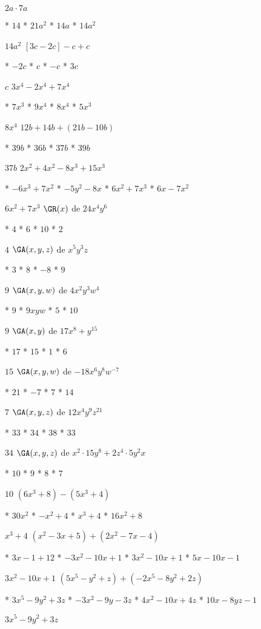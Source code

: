$2a\cdot 7a$
\begin{enum}
	* $14$
	* $21a^2$
	* $14a$
	* $14a^2$
\end{enum}
$14a^2$
$[3c-2c]-c+c$
\begin{enum}
	* $-2c$
	* $c$
	* $-c$
	* $3c$
\end{enum}
$c$
$3x^4-2x^4+7x^4$
\begin{enum}
	* $7x^3$
	* $9x^4$
	* $8x^4$
	* $5x^3$
\end{enum}
$8x^4$
$12b+14b+(21b-10b)$
\begin{enum}
	* $39b$
	* $36b$
	* $37b$
	* $39b$
\end{enum}
$37b$
$2x^2+4x^2-8x^3+15x^3$
\begin{enum}
	* $-6x^3+7x^2$
	* $-5y^2-8x$
	* $6x^2+7x^3$
	* $6x-7x^2$
\end{enum}
$6x^2+7x^3$
$\GR(x)$ de $24x^4y^6$
\begin{enum}
	* $4$
	* $6$
	* $10$
	* $2$
\end{enum}
$4$
$\GA(x,y,z)$ de $x^5y^3z$
\begin{enum}
	* $3$
	* $8$
	* $-8$
	* $9$
\end{enum}
$9$
$\GA(x,y,w)$ de $4x^2y^3w^4$
\begin{enum}
	* $9$
	* $9xyw$
	* $5$
	* $10$
\end{enum}
$9$
$\GA(x,y)$ de $17x^8+y^{15}$
\begin{enum}
	* $17$
	* $15$
	* $1$
	* $6$
\end{enum}
$15$
$\GA(x,y,w)$ de $-18x^6y^8w^{-7}$
\begin{enum}
	* $21$
	* $-7$
	* $7$
	* $14$
\end{enum}
$7$
$\GA(x,y,z)$ de $12x^4y^9z^{21}$
\begin{enum}
	* $33$
	* $34$
	* $38$
	* $33$
\end{enum}
$34$
$\GA(x,y,z)$ de $x^2\cdot 15y^8+2z^4\cdot 5y^2x$
\begin{enum}
	* $10$
	* $9$
	* $8$
	* $7$
\end{enum}
$10$
$\left(6x^3+8\right)-\left(5x^3+4\right)$
\begin{enum}
	* $30x^2$
	* $-x^2+4$
	* $x^3+4$
	* $16x^2+8$
\end{enum}
$x^3+4$
$\left(x^2-3x+5\right)+\left(2x^2-7x-4\right)$
\begin{enum}
	* $3x-1+12$
	* $-3x^2-10x+1$
	* $3x^2-10x+1$
	* $5x-10x-1$
\end{enum}
$3x^2-10x+1$
$\left(5x^5-y^2+z\right)+\left(-2x^5-8y^2+2z\right)$
\begin{enum}
	* $3x^5-9y^2+3z$
	* $-3x^2-9y-3z$
	* $4x^2-10x+4z$
	* $10x-8yz-1$
\end{enum}
$3x^5-9y^2+3z$

